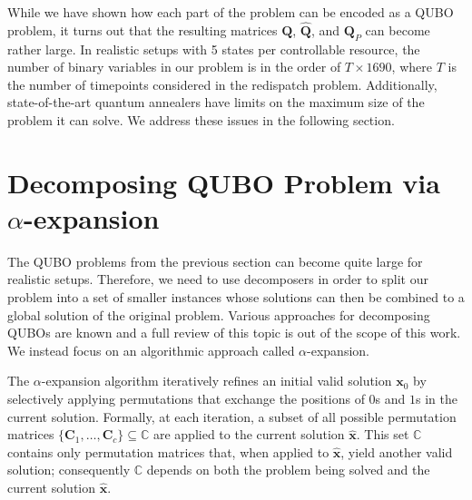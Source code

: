 \documentclass[conference]{IEEEtran}
\makeatletter
\newcommand{\bQ}{\boldsymbol{Q}}
\newcommand{\bx}{\boldsymbol{x}}
\newcommand{\mat}[1]{\bm{#1}}
\newcommand{\QUBO}{\textsc{QUBO}\@\xspace}
\makeatother
\begin{document}
While we have shown how each part of the problem can be encoded as a
{\QUBO} problem, it turns out that the resulting matrices $\mat{Q}$,
$\hat{\bQ}$, and $\mat{Q}_{P}$ can become rather large. In realistic
setups with 5 states per controllable resource, the number of binary
variables in our problem is in the order of $T\times 1690$, where $T$ is
the number of timepoints considered in the redispatch problem.
Additionally, state-of-the-art quantum annealers have limits on the
maximum size of the problem it can solve. We address these issues in the
following section.

\section{Decomposing QUBO Problem via
  $\alpha$-expansion} \label{sec:alpha}

The {\QUBO} problems from the previous section can become quite large
for realistic setups.  Therefore, we need to use decomposers in order to
split our problem into a set of smaller instances whose solutions can
then be combined to a global solution of the original problem. %
Various approaches for decomposing {\QUBO}s are known and a full review
of this topic is out of the scope of this work.  We instead focus on an
algorithmic approach called $\alpha$-expansion.

The $\alpha$-expansion algorithm iteratively refines an initial valid
solution $\bx_0$ by selectively applying permutations that exchange the
positions of $0$s and $1$s in the current solution. Formally, at each
iteration, a subset of all possible permutation matrices
$\{\mat{C}_{1},\ldots,\mat{C}_{c}\} \subseteq \mathbb{C}$ are applied to
the current solution $\hat{\bx}$.  This set $\mathbb{C}$ contains only
permutation matrices that, when applied to $\hat{\bx}$, yield another
valid solution; consequently $\mathbb{C}$ depends on both the problem
being solved and the current solution $\hat{\bx}$.
\end{document}
